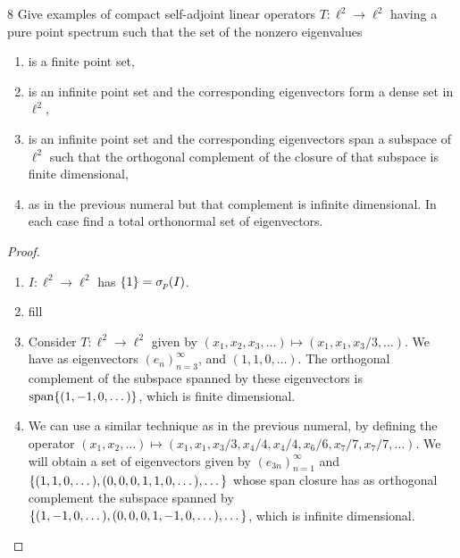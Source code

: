 \begin{exercise}{8}
Give examples of compact self-adjoint linear operators $T: \ell^2 \to \ell^2$ having a pure point spectrum such that the set of the nonzero eigenvalues 
\begin{enumerate}
    \item is a finite point set,
    \item is an infinite point set and the corresponding eigenvectors form a dense set in $\ell^2$,
    \item is an infinite point set and the corresponding eigenvectors span a subspace of $\ell^2$ such that the orthogonal complement of the closure of that subspace is finite dimensional,
    \item as in the previous numeral but that complement is infinite dimensional.
In each case find a total orthonormal set of eigenvectors.
\end{enumerate}
\end{exercise}
\begin{proof}
\begin{enumerate}
    \item $I: \ell^2 \to \ell^2$ has $\{1\} = \sigma_p(I)$.
    \item fill
    \item Consider $T: \ell^2 \to \ell^2$ given by $(x_1, x_2, x_3, \dots) \mapsto (x_1, x_1, x_3/3, \dots )$.
    We have as eigenvectors $(e_n)_{n=3}^\infty$, and $(1, 1, 0, \dots)$.
    The orthogonal complement of the subspace spanned by these eigenvectors is $\operatorname*{span}\{(1, -1, 0, \dots)\}$, which is finite dimensional.
    \item We can use a similar technique as in the previous numeral, by defining the operator $(x_1, x_2, \dots) \mapsto (x_1, x_1, x_3/3, x_4/4, x_4/4, x_6/6, x_7/7, x_7/7, \dots)$.
    We will obtain a set of eigenvectors given by $(e_{3n})_{n=1}^\infty$ and $\{(1, 1, 0, \dots), (0, 0, 0, 1, 1, 0, \dots), \dots\}$ whose span closure has as orthogonal complement the subspace spanned by $\{(1, -1, 0, \dots), (0, 0, 0, 1, -1, 0, \dots), \dots\}$, which is infinite dimensional.
\end{enumerate}
\end{proof} 

